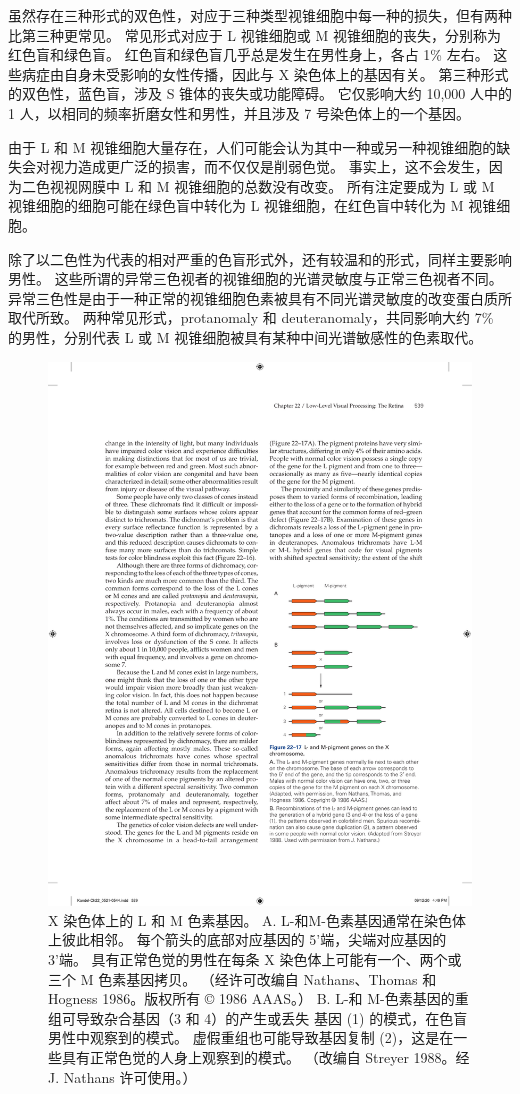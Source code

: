 虽然存在三种形式的双色性，对应于三种类型视锥细胞中每一种的损失，但有两种比第三种更常见。
常见形式对应于 L 视锥细胞或 M 视锥细胞的丧失，分别称为红色盲和绿色盲。
红色盲和绿色盲几乎总是发生在男性身上，各占 1\% 左右。
这些病症由自身未受影响的女性传播，因此与 X 染色体上的基因有关。
第三种形式的双色性，蓝色盲，涉及 S 锥体的丧失或功能障碍。
它仅影响大约 10,000 人中的 1 人，以相同的频率折磨女性和男性，并且涉及 7 号染色体上的一个基因。


由于 L 和 M 视锥细胞大量存在，人们可能会认为其中一种或另一种视锥细胞的缺失会对视力造成更广泛的损害，而不仅仅是削弱色觉。
事实上，这不会发生，因为二色视视网膜中 L 和 M 视锥细胞的总数没有改变。
所有注定要成为 L 或 M 视锥细胞的细胞可能在绿色盲中转化为 L 视锥细胞，在红色盲中转化为 M 视锥细胞。


除了以二色性为代表的相对严重的色盲形式外，还有较温和的形式，同样主要影响男性。
这些所谓的异常三色视者的视锥细胞的光谱灵敏度与正常三色视者不同。
异常三色性是由于一种正常的视锥细胞色素被具有不同光谱灵敏度的改变蛋白质所取代所致。
两种常见形式，protanomaly 和 deuteranomaly，共同影响大约 7\% 的男性，分别代表 L 或 M 视锥细胞被具有某种中间光谱敏感性的色素取代。


\begin{figure}[htbp]
	\centering
	\includegraphics[width=0.5\linewidth]{chap22/fig_22_17}
	\caption{X 染色体上的 L 和 M 色素基因。 
		A. L-和M-色素基因通常在染色体上彼此相邻。 
		每个箭头的底部对应基因的 5'端，尖端对应基因的 3'端。 
		具有正常色觉的男性在每条 X 染色体上可能有一个、两个或三个 M 色素基因拷贝。 （经许可改编自 Nathans、Thomas 和 Hogness 1986。版权所有 © 1986 AAAS。） 
		B. L-和 M-色素基因的重组可导致杂合基因（3 和 4）的产生或丢失 基因 (1) 的模式，在色盲男性中观察到的模式。 
		虚假重组也可能导致基因复制 (2)，这是在一些具有正常色觉的人身上观察到的模式。 （改编自 Streyer 1988。经 J. Nathans 许可使用。）}
	\label{fig:22_17}
\end{figure}


